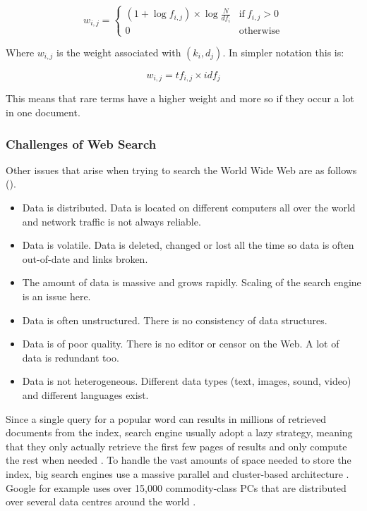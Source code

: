 \begin{equation}
  w_{i,j} =
  \begin{cases}
  (1+\log f_{i,j})\times \log\frac{N}{df_i} & \text{if} \ f_{i,j} > 0 \\
  0 & \text{otherwise}
  \end{cases}
  \label{eq:wij}
\end{equation}

Where $w_{i,j}$ is the weight associated with $(k_i,d_j)$. In simpler notation this is:

\begin{equation}
  w_{i,j} = tf_{i,j}\times idf_j
  \label{eq:wij2}
\end{equation}

This means that rare terms have a higher weight and more so if they occur a lot in one document.


\subsubsection*{Challenges of Web Search}

Other issues that arise when trying to search the World Wide Web are as follows (\citep[p.449]{Baeza-Yates2011}).

\begin{itemize}
  \item Data is distributed. Data is located on different computers all over the world and network traffic is not always reliable.
  \item Data is volatile. Data is deleted, changed or lost all the time so data is often out-of-date and links broken.
  \item The amount of data is massive and grows rapidly. Scaling of the search engine is an issue here.
  \item Data is often unstructured. There is no consistency of data structures.
  \item Data is of poor quality. There is no editor or censor on the Web. A lot of data is redundant too.
  \item Data is not heterogeneous. Different data types (text, images, sound, video) and different languages exist.
\end{itemize}

Since a single query for a popular word can results in  millions of retrieved documents from the index, search engine usually adopt a lazy strategy, meaning that they only actually retrieve the first few pages of results and only compute the rest when needed \citep[p.459]{Baeza-Yates2011}. To handle the vast amounts of space needed to store the index, big search engines use a massive parallel and cluster-based architecture \citep[p.459]{Baeza-Yates2011}. Google for example uses over 15,000 commodity-class PCs that are distributed over several data centres around the world \citep{Dean2003}.



